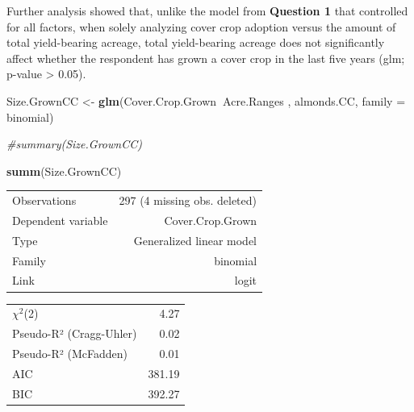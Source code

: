 \documentclass[12pt,]{article}
\newenvironment{Shaded}{\begin{snugshade}}{\end{snugshade}}
\newcommand{\KeywordTok}[1]{\textcolor[rgb]{0.13,0.29,0.53}{\textbf{#1}}}
\newcommand{\DataTypeTok}[1]{\textcolor[rgb]{0.13,0.29,0.53}{#1}}
\newcommand{\StringTok}[1]{\textcolor[rgb]{0.31,0.60,0.02}{#1}}
\newcommand{\CommentTok}[1]{\textcolor[rgb]{0.56,0.35,0.01}{\textit{#1}}}
\newcommand{\OperatorTok}[1]{\textcolor[rgb]{0.81,0.36,0.00}{\textbf{#1}}}
\newcommand{\NormalTok}[1]{#1}
\begin{document}
\FloatBarrier

Further analysis showed that, unlike the model from \textbf{Question 1}
that controlled for all factors, when solely analyzing cover crop
adoption versus the amount of total yield-bearing acreage, total
yield-bearing acreage does not significantly affect whether the
respondent has grown a cover crop in the last five years (glm; p-value
\textgreater{} 0.05).

\begin{Shaded}
\begin{Highlighting}[]
\NormalTok{Size.GrownCC <-}\StringTok{ }\KeywordTok{glm}\NormalTok{(Cover.Crop.Grown}\OperatorTok{~}\NormalTok{Acre.Ranges , almonds.CC, }\DataTypeTok{family =}\NormalTok{ binomial)}

\CommentTok{#summary(Size.GrownCC)}

\KeywordTok{summ}\NormalTok{(Size.GrownCC)}
\end{Highlighting}
\end{Shaded}

\begin{table}[!h]
\centering
\begin{tabular}{lr}
\toprule
\rowcolor{gray!6}  Observations & 297 (4 missing obs. deleted)\\
Dependent variable & Cover.Crop.Grown\\
\rowcolor{gray!6}  Type & Generalized linear model\\
Family & binomial\\
\rowcolor{gray!6}  Link & logit\\
\bottomrule
\end{tabular}
\end{table}

\begin{table}[!h]
\centering
\begin{tabular}{lr}
\toprule
\rowcolor{gray!6}  $\chi^2$(2) & 4.27\\
Pseudo-R² (Cragg-Uhler) & 0.02\\
\rowcolor{gray!6}  Pseudo-R² (McFadden) & 0.01\\
AIC & 381.19\\
\rowcolor{gray!6}  BIC & 392.27\\
\bottomrule
\end{tabular}
\end{table}
\end{document}
